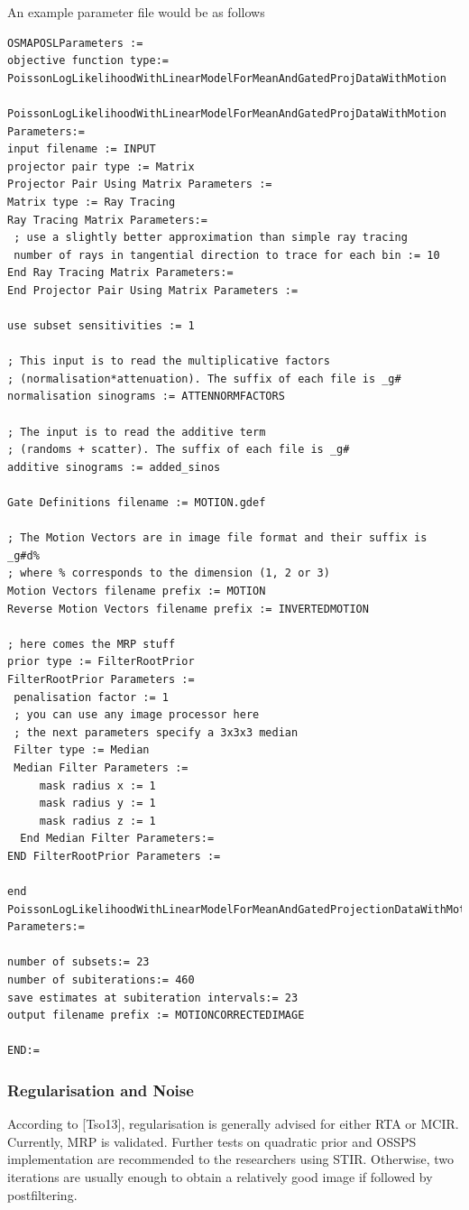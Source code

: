 \documentclass{article}
\begin{document}
An example parameter file would be as follows
{
\small
\begin{verbatim}
OSMAPOSLParameters :=
objective function type:= PoissonLogLikelihoodWithLinearModelForMeanAndGatedProjDataWithMotion

PoissonLogLikelihoodWithLinearModelForMeanAndGatedProjDataWithMotion Parameters:=
input filename := INPUT
projector pair type := Matrix
Projector Pair Using Matrix Parameters :=
Matrix type := Ray Tracing
Ray Tracing Matrix Parameters:=
 ; use a slightly better approximation than simple ray tracing
 number of rays in tangential direction to trace for each bin := 10
End Ray Tracing Matrix Parameters:=
End Projector Pair Using Matrix Parameters :=

use subset sensitivities := 1

; This input is to read the multiplicative factors
; (normalisation*attenuation). The suffix of each file is _g#
normalisation sinograms := ATTENNORMFACTORS

; The input is to read the additive term 
; (randoms + scatter). The suffix of each file is _g#
additive sinograms := added_sinos

Gate Definitions filename := MOTION.gdef

; The Motion Vectors are in image file format and their suffix is _g#d% 
; where % corresponds to the dimension (1, 2 or 3) 
Motion Vectors filename prefix := MOTION
Reverse Motion Vectors filename prefix := INVERTEDMOTION

; here comes the MRP stuff
prior type := FilterRootPrior
FilterRootPrior Parameters :=
 penalisation factor := 1
 ; you can use any image processor here
 ; the next parameters specify a 3x3x3 median
 Filter type := Median
 Median Filter Parameters :=
     mask radius x := 1
     mask radius y := 1
     mask radius z := 1
  End Median Filter Parameters:=
END FilterRootPrior Parameters :=

end PoissonLogLikelihoodWithLinearModelForMeanAndGatedProjectionDataWithMotion Parameters:=

number of subsets:= 23
number of subiterations:= 460
save estimates at subiteration intervals:= 23 
output filename prefix := MOTIONCORRECTEDIMAGE

END:=
\end{verbatim}
}

\subsubsection{Regularisation and Noise}
According to [Tso13], regularisation is generally advised for either RTA or MCIR.
Currently, MRP is validated. Further tests on quadratic prior and OSSPS
implementation are recommended to the researchers using STIR. Otherwise, two
iterations are usually enough to obtain a relatively good image if followed by
postfiltering. 
\end{document}

